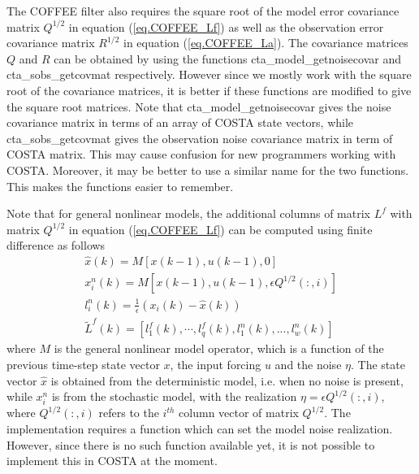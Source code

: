 \documentclass[a4paper,12pt]{article}
\begin{document}
         The COFFEE filter also requires the square root of the model error
         covariance matrix $Q^{1/2}$ in equation (\ref{eq.COFFEE_Lf}) as well
         as the observation error covariance matrix $R^{1/2}$ in equation
         (\ref{eq.COFFEE_La}). The covariance matrices $Q$ and $R$ can be
         obtained by using the functions cta\_model\_getnoisecovar and
         cta\_sobs\_getcovmat respectively. However since we mostly work with
         the square root of the covariance matrices, it is better if these
         functions are modified to give the square root matrices. Note that
         cta\_model\_getnoisecovar gives the noise covariance matrix in terms
         of an array of COSTA state vectors, while cta\_sobs\_getcovmat gives
         the observation noise covariance matrix in term of COSTA matrix. This
         may cause confusion for new programmers working with COSTA. Moreover,
         it may be better to use a similar name for the two functions. This
         makes the functions easier to remember.

         Note that for general nonlinear models, the additional columns of
         matrix $L^f$ with matrix $Q^{1/2}$ in equation (\ref{eq.COFFEE_Lf})
         can be computed using finite difference as follows
         \begin{eqnarray}
             \hat{x}(k) = M[x(k-1),u(k-1),0] \\
             x^n_i(k) = M[x(k-1),u(k-1),\epsilon Q^{1/2}(:,i)] \\
             l^n_i(k) =  \frac{1}{\epsilon} (x_i(k) - \hat{x}(k))\\
             \tilde{L}^f(k)=[l_1^f(k),\cdots,l_q^f(k),l^n_1(k),...,l^n_w(k)]
         \end{eqnarray}
         where $M$ is the general nonlinear model operator, which is a function
         of the previous time-step state vector $x$, the input forcing $u$ and
         the noise $\eta$. The state vector $\hat{x}$ is obtained from the
         deterministic model, i.e. when no noise is present, while $x^n_i$ is
         from the stochastic model, with the realization $\eta=\epsilon
         Q^{1/2}(:,i)$, where $Q^{1/2}(:,i)$ refers to the $i^{th}$ column
         vector of matrix $Q^{1/2}$. The implementation requires a function
         which can set the model noise realization. However, since there is no
         such function available yet, it is not possible to
         implement this in COSTA at the moment.
\end{document}

